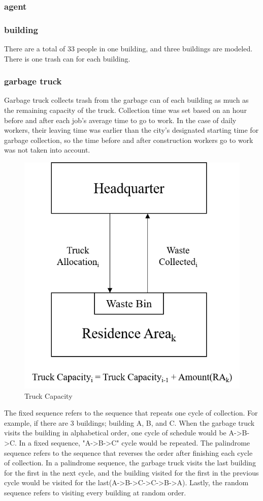 \documentclass{scsSimAUDPaperFormat}
\begin{document}
\subsubsection{agent}

\subsubsection{building}
There are a total of 33 people in one building, and three buildings are modeled. There is one trash can for each building.
\subsubsection{garbage truck}
Garbage truck collects trash from the garbage can of each building as much as the remaining capacity of the truck. Collection time was set based on an hour before and after each job's average time to go to work. In the case of daily workers, their leaving time was earlier than the city's designated starting time for garbage collection, so the time before and after construction workers go to work was not taken into account.
\begin{figure}
  \centering
    \includegraphics[width=.80\columnwidth]{fig/HQTruckCapacity.png}
    \caption{Truck Capacity}
    \label{Fig:Truck Capacity}

\end{figure}
The fixed sequence refers to the sequence that repeats one cycle of collection. For example, if there are 3 buildings; building A, B, and C. When the garbage truck visits the building in alphabetical order, one cycle of schedule would be A->B->C. In a fixed sequence, "A->B->C" cycle would be repeated. The palindrome sequence refers to the sequence that reverses the order after finishing each cycle of collection. In a palindrome sequence, the garbage truck visits the last building for the first in the next cycle, and the building visited for the first in the previous cycle would be visited for the last(A->B->C->C->B->A). Lastly, the random sequence refers to visiting every building at random order.
\end{document}
